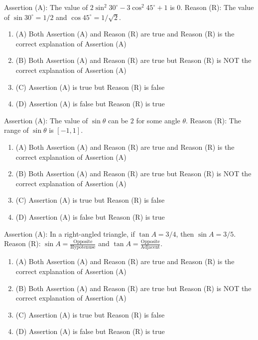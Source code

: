 \documentclass[12pt,a4paper]{exam}
\begin{document}
\begin{questions}
\question[1] Assertion (A): The value of $2 \sin^2 30^\circ - 3 \cos^2 45^\circ + 1$ is $0$. 
Reason (R): The value of $\sin 30^\circ = 1/2$ and $\cos 45^\circ = 1/\sqrt{2}$.
\begin{enumerate}[label=(\Alph*)]
  \item (A) Both Assertion (A) and Reason (R) are true and Reason (R) is the correct explanation of Assertion (A)
  \item (B) Both Assertion (A) and Reason (R) are true but Reason (R) is NOT the correct explanation of Assertion (A)
  \item (C) Assertion (A) is true but Reason (R) is false
  \item (D) Assertion (A) is false but Reason (R) is true
\end{enumerate}
\vspace{0.15cm}

\question[1] Assertion (A): The value of $\sin \theta$ can be $2$ for some angle $\theta$. 
Reason (R): The range of $\sin \theta$ is $[-1, 1]$.
\begin{enumerate}[label=(\Alph*)]
  \item (A) Both Assertion (A) and Reason (R) are true and Reason (R) is the correct explanation of Assertion (A)
  \item (B) Both Assertion (A) and Reason (R) are true but Reason (R) is NOT the correct explanation of Assertion (A)
  \item (C) Assertion (A) is true but Reason (R) is false
  \item (D) Assertion (A) is false but Reason (R) is true
\end{enumerate}
\vspace{0.15cm}

\question[1] Assertion (A): In a right-angled triangle, if $\tan A = 3/4$, then $\sin A = 3/5$. 
Reason (R): $\sin A = \frac{\text{Opposite}}{\text{Hypotenuse}}$ and $\tan A = \frac{\text{Opposite}}{\text{Adjacent}}$.
\begin{enumerate}[label=(\Alph*)]
  \item (A) Both Assertion (A) and Reason (R) are true and Reason (R) is the correct explanation of Assertion (A)
  \item (B) Both Assertion (A) and Reason (R) are true but Reason (R) is NOT the correct explanation of Assertion (A)
  \item (C) Assertion (A) is true but Reason (R) is false
  \item (D) Assertion (A) is false but Reason (R) is true
\end{enumerate}
\vspace{0.15cm}


\end{questions}
\end{document}
